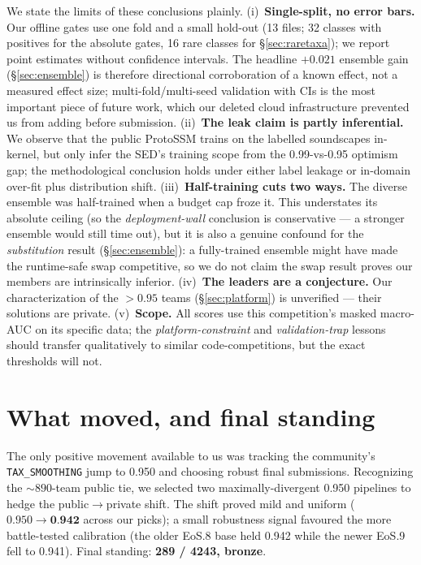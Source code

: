 \documentclass{ceurart}
\begin{document}
We state the limits of these conclusions plainly.
(i)~\textbf{Single-split, no error bars.} Our offline gates use one fold and a small
hold-out (13 files; 32 classes with positives for the absolute gates, 16 rare
classes for \S\ref{sec:raretaxa}); we report point estimates without confidence
intervals. The headline $+0.021$ ensemble gain (\S\ref{sec:ensemble}) is therefore
directional corroboration of a known effect, not a measured effect size;
multi-fold/multi-seed validation with CIs is the most important piece of future
work, which our deleted cloud infrastructure prevented us from adding before
submission.
(ii)~\textbf{The leak claim is partly inferential.} We observe that the public
ProtoSSM trains on the labelled soundscapes in-kernel, but only infer the SED's
training scope from the 0.99-vs-0.95 optimism gap; the methodological conclusion
holds under either label leakage or in-domain over-fit plus distribution shift.
(iii)~\textbf{Half-training cuts two ways.} The diverse ensemble was half-trained
when a budget cap froze it. This understates its absolute ceiling (so the
\emph{deployment-wall} conclusion is conservative --- a stronger ensemble would
still time out), but it is also a genuine confound for the \emph{substitution}
result (\S\ref{sec:ensemble}): a fully-trained ensemble might have made the
runtime-safe swap competitive, so we do not claim the swap result proves our
members are intrinsically inferior.
(iv)~\textbf{The leaders are a conjecture.} Our characterization of the $>0.95$
teams (\S\ref{sec:platform}) is unverified --- their solutions are private.
(v)~\textbf{Scope.} All scores use this competition's masked macro-AUC on its
specific data; the \emph{platform-constraint} and \emph{validation-trap} lessons
should transfer qualitatively to similar code-competitions, but the exact
thresholds will not.

\section{What moved, and final standing}
\label{sec:standing}

The only positive movement available to us was tracking the community's
\texttt{TAX\_SMOOTHING} jump to 0.950 and choosing robust final submissions.
Recognizing the ${\sim}890$-team public tie, we selected two maximally-divergent
0.950 pipelines to hedge the public$\to$private shift. The shift proved mild and
uniform ($0.950 \to \textbf{0.942}$ across our picks); a small robustness signal
favoured the more battle-tested calibration (the older EoS.8 base held 0.942 while
the newer EoS.9 fell to 0.941). Final standing: \textbf{289 / 4243, bronze}.
\end{document}
